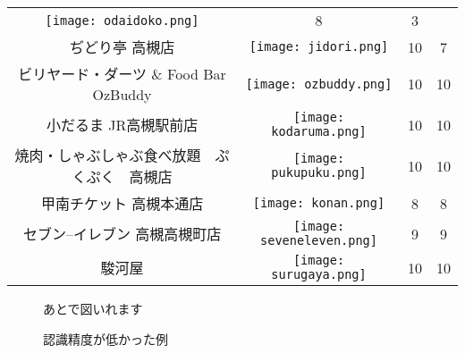 \begin{table}[t]
\begin{center}
\begin{tabular}{cc|cc}
\begin{minipage}{40mm}
          \texttt{[image: odaidoko.png]}
        \end{minipage} & 8 & 3 \\
        ぢどり亭 高槻店 & 
        \begin{minipage}{40mm}
          \centering
          \texttt{[image: jidori.png]}
        \end{minipage} & 10 & 7 \\
        ビリヤード・ダーツ \& Food Bar OzBuddy & 
        \begin{minipage}{40mm}
          \centering
          \texttt{[image: ozbuddy.png]}
        \end{minipage} & 10 & 10 \\
        小だるま JR高槻駅前店 &
        \begin{minipage}{40mm}
          \centering
          \texttt{[image: kodaruma.png]}
        \end{minipage} & 10 & 10 \\
        焼肉・しゃぶしゃぶ食べ放題　ぷくぷく　高槻店 & 
        \begin{minipage}{40mm}
          \centering
          \texttt{[image: pukupuku.png]}
        \end{minipage} & 10 & 10 \\
        甲南チケット 高槻本通店 & 
        \begin{minipage}{40mm}
          \centering
          \texttt{[image: konan.png]}
        \end{minipage} & 8 & 8 \\
        セブン--イレブン 高槻高槻町店 & 
        \begin{minipage}{40mm}
          \centering
          \texttt{[image: seveneleven.png]}
        \end{minipage} & 9 & 9 \\
        駿河屋 & 
        \begin{minipage}{40mm}
          \centering
          \texttt{[image: surugaya.png]}
        \end{minipage} & 10 & 10 \\
        \hline
      \end{tabular}
    \end{center}
  \end{table}

  \begin{figure}[tb]
    あとで図いれます
    \caption{認識精度が低かった例}
    \label{figure:recog_discussion}
  \end{figure}
